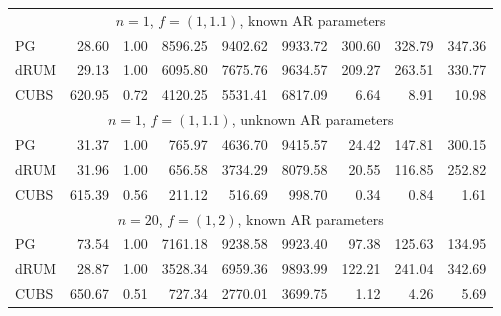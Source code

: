 \documentclass[12pt]{article}
\begin{document}
\begin{table}
\begin{center}
\begin{tabular}{l r r r r r r r r }

\multicolumn{9}{c}{$n=1$, $f = (1,1.1)$, known AR parameters} \\
             PG   &    28.60 &     1.00 &   8596.25 &   9402.62 &   9933.72 &    300.60 &    328.79 &    347.36 \\ 
           dRUM   &    29.13 &     1.00 &   6095.80 &   7675.76 &   9634.57 &    209.27 &    263.51 &    330.77 \\ 
           CUBS   &   620.95 &     0.72 &   4120.25 &   5531.41 &   6817.09 &      6.64 &      8.91 &     10.98
 \\ %


\multicolumn{9}{c}{$n=1$, $f = (1,1.1)$, unknown AR parameters} \\
             PG   &    31.37 &     1.00 &    765.97 &   4636.70 &   9415.57 &     24.42 &    147.81 &    300.15 \\ 
           dRUM   &    31.96 &     1.00 &    656.58 &   3734.29 &   8079.58 &     20.55 &    116.85 &    252.82 \\ 
           CUBS   &   615.39 &     0.56 &    211.12 &    516.69 &    998.70 &      0.34 &      0.84 &      1.61
 \\ %

\multicolumn{9}{c}{$n=20$, $f = (1,2)$, known AR parameters} \\
             PG   &    73.54 &     1.00 &   7161.18 &   9238.58 &   9923.40 &     97.38 &    125.63 &    134.95 \\ 
           dRUM   &    28.87 &     1.00 &   3528.34 &   6959.36 &   9893.99 &    122.21 &    241.04 &    342.69 \\ 
           CUBS   &   650.67 &     0.51 &    727.34 &   2770.01 &   3699.75 &      1.12 &      4.26 &      5.69
 \\ %



\end{tabular}
\end{center}
\end{table}
\end{document}
